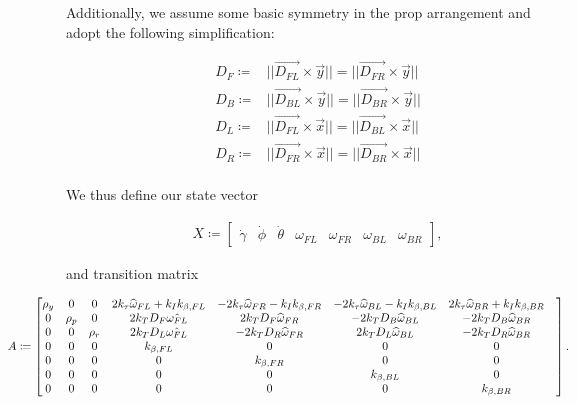 \documentclass{article}
\begin{document}
Additionally, we assume some basic symmetry in the prop arrangement and adopt the following simplification:

\begin{align*}
    D_F \coloneqq& ||\vec{D_{FL}} \times \vec{y}|| = ||\vec{D_{FR}} \times \vec{y}||\\
    D_B \coloneqq& ||\vec{D_{BL}} \times \vec{y}|| = ||\vec{D_{BR}} \times \vec{y}||\\
    D_L \coloneqq& ||\vec{D_{FL}} \times \vec{x}|| = ||\vec{D_{BL}} \times \vec{x}||\\
    D_R \coloneqq& ||\vec{D_{FR}} \times \vec{x}|| = ||\vec{D_{BR}} \times \vec{x}||\\
\end{align*}

We thus define our state vector

\setcounter{MaxMatrixCols}{20}
\begin{equation}
\begin{aligned}
    X \coloneqq \begin{bmatrix}
    \dot{\gamma} & \dot{\phi} & \dot{\theta} & \omega_{FL} & \omega_{FR} & \omega_{BL} & \omega_{BR}
\end{bmatrix},
\end{aligned}
\end{equation}

and transition matrix

\begin{equation}
\hspace{-0.7in}A \coloneqq \begin{bmatrix}
\rho_y & 0 & 0 & 2 k_\tau \widehat{\omega}_{FL} + k_Ik_{\beta, FL} & - 2 k_\tau \widehat{\omega}_{FR} - k_Ik_{\beta, FR} & - 2 k_\tau \widehat{\omega}_{BL} - k_Ik_{\beta, BL} & 2 k_\tau \widehat{\omega}_{BR} + k_Ik_{\beta, BR}\\
0 & \rho_p & 0 & 2 k_T D_F \hat{\omega_{FL}} & 2 k_T D_F \widehat{\omega}_{FR} & -2 k_T D_B \widehat{\omega}_{BL} & -2 k_T D_B\widehat{\omega}_{BR}\\
0 & 0 & \rho_r & 2 k_T D_L\hat{\omega_{FL}} & -2 k_T D_R \widehat{\omega}_{FR} & 2 k_T D_L\widehat{\omega}_{BL} & -2 k_T D_R\widehat{\omega}_{BR}\\
0 & 0 & 0 & k_{\beta, FL} & 0 & 0 & 0\\
0 & 0 & 0 & 0 & k_{\beta, FR} & 0 & 0 &\\
0 & 0 & 0 & 0 & 0 & k_{\beta, BL} & 0\\
0 & 0 & 0 & 0 & 0 & 0 & k_{\beta, BR}\\
\end{bmatrix}.\\
\end{equation}
\end{document}
